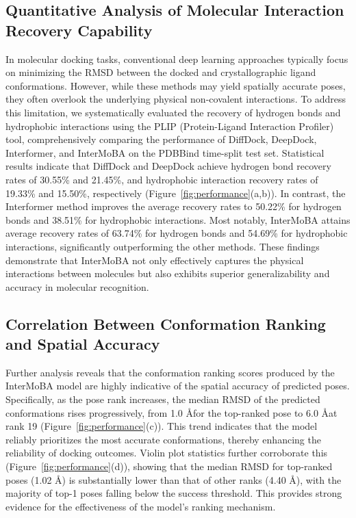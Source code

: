 \documentclass[lettersize,journal]{IEEEtran}
\begin{document}
\subsection{Quantitative Analysis of Molecular Interaction Recovery Capability}
In molecular docking tasks, conventional deep learning approaches typically focus on minimizing the RMSD between the docked and crystallographic ligand conformations. However, while these methods may yield spatially accurate poses, they often overlook the underlying physical non-covalent interactions. To address this limitation, we systematically evaluated the recovery of hydrogen bonds and hydrophobic interactions\cite{nemethy1967hydrophobic} using the PLIP (Protein-Ligand Interaction Profiler)\cite{salentin2015plip} tool, comprehensively comparing the performance of DiffDock\cite{corso2022diffdock}, DeepDock\cite{liao2019deepdock}, Interformer\cite{lai2024interformer}, and InterMoBA on the PDBBind\cite{wang2005pdbbind} time-split test set. Statistical results indicate that DiffDock and DeepDock achieve hydrogen bond recovery rates of 30.55\% and 21.45\%, and hydrophobic interaction recovery rates\cite{buttenschoen2024posebusters} of 19.33\% and 15.50\%, respectively (Figure~\ref{fig:performance}(a,b)). In contrast, the Interformer method improves the average recovery rates to 50.22\% for hydrogen bonds and 38.51\% for hydrophobic interactions. Most notably, InterMoBA attains average recovery rates of 63.74\% for hydrogen bonds and 54.69\% for hydrophobic interactions, significantly outperforming the other methods. These findings demonstrate that InterMoBA not only effectively captures the physical interactions between molecules but also exhibits superior generalizability and accuracy in molecular recognition.

\subsection{Correlation Between Conformation Ranking and Spatial Accuracy}
Further analysis reveals that the conformation ranking scores produced by the InterMoBA model are highly indicative of the spatial accuracy of predicted poses. Specifically, as the pose rank increases, the median RMSD of the predicted conformations rises progressively, from 1.0 \AA for the top-ranked pose to 6.0 \AA at rank 19 (Figure~\ref{fig:performance}(c)). This trend indicates that the model reliably prioritizes the most accurate conformations, thereby enhancing the reliability of docking outcomes. Violin plot statistics further corroborate this (Figure~\ref{fig:performance}(d)), showing that the median RMSD for top-ranked poses (1.02 \AA) is substantially lower than that of other ranks (4.40 \AA), with the majority of top-1 poses falling below the success threshold. This provides strong evidence for the effectiveness of the model's ranking mechanism.
\end{document}
